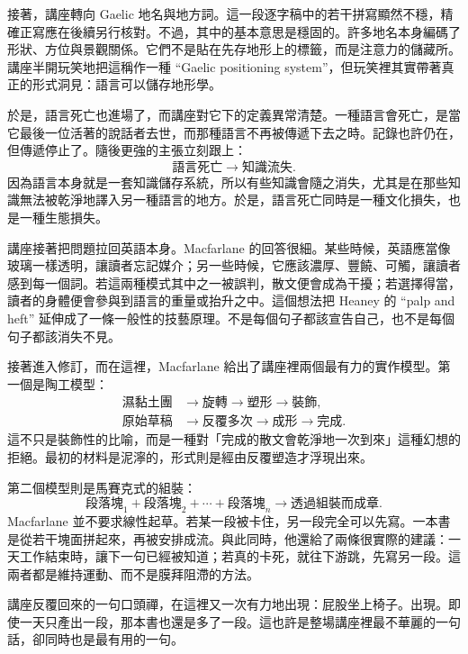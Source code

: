 接著，講座轉向 Gaelic 地名與地方詞。這一段逐字稿中的若干拼寫顯然不穩，精確正寫應在後續另行核對。不過，其中的基本意思是穩固的。許多地名本身編碼了形狀、方位與景觀關係。它們不是貼在先存地形上的標籤，而是注意力的儲藏所。講座半開玩笑地把這稱作一種 ``Gaelic positioning system''，但玩笑裡其實帶著真正的形式洞見：語言可以儲存地形學。

於是，語言死亡也進場了，而講座對它下的定義異常清楚。一種語言會死亡，是當它最後一位活著的說話者去世，而那種語言不再被傳遞下去之時。記錄也許仍在，但傳遞停止了。隨後更強的主張立刻跟上：
\begin{equation}
\text{語言死亡} \longrightarrow \text{知識流失}.
\end{equation}
因為語言本身就是一套知識儲存系統，所以有些知識會隨之消失，尤其是在那些知識無法被乾淨地譯入另一種語言的地方。於是，語言死亡同時是一種文化損失，也是一種生態損失。

講座接著把問題拉回英語本身。Macfarlane 的回答很細。某些時候，英語應當像玻璃一樣透明，讓讀者忘記媒介；另一些時候，它應該濃厚、豐饒、可觸，讓讀者感到每一個詞。若這兩種模式其中之一被誤判，散文便會成為干擾；若選擇得當，讀者的身體便會參與到語言的重量或抬升之中。這個想法把 Heaney 的 ``palp and heft'' 延伸成了一條一般性的技藝原理。不是每個句子都該宣告自己，也不是每個句子都該消失不見。

接著進入修訂，而在這裡，Macfarlane 給出了講座裡兩個最有力的實作模型。第一個是陶工模型：
\begin{align}
\text{濕黏土團} &\longrightarrow \text{旋轉} \longrightarrow \text{塑形} \longrightarrow \text{裝飾},\\
\text{原始草稿} &\longrightarrow \text{反覆多次} \longrightarrow \text{成形} \longrightarrow \text{完成}.
\end{align}
這不只是裝飾性的比喻，而是一種對「完成的散文會乾淨地一次到來」這種幻想的拒絕。最初的材料是泥濘的，形式則是經由反覆塑造才浮現出來。

第二個模型則是馬賽克式的組裝：
\begin{equation}
\text{段落塊}_1 + \text{段落塊}_2 + \cdots + \text{段落塊}_n
\longrightarrow \text{透過組裝而成章}.
\end{equation}
Macfarlane 並不要求線性起草。若某一段被卡住，另一段完全可以先寫。一本書是從若干塊面拼起來，再被安排成流。與此同時，他還給了兩條很實際的建議：一天工作結束時，讓下一句已經被知道；若真的卡死，就往下游跳，先寫另一段。這兩者都是維持運動、而不是膜拜阻滯的方法。

講座反覆回來的一句口頭禪，在這裡又一次有力地出現：屁股坐上椅子。出現。即使一天只產出一段，那本書也還是多了一段。這也許是整場講座裡最不華麗的一句話，卻同時也是最有用的一句。

